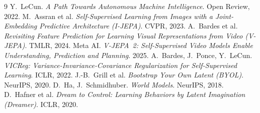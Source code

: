 \documentclass[11pt]{article}
\begin{document}
\begin{thebibliography}{9}
\small
{} Y.~LeCun. \emph{A Path Towards Autonomous Machine Intelligence}. Open Review, 2022.
 M.~Assran et al. \emph{Self-Supervised Learning from Images with a Joint-Embedding
Predictive Architecture (I-JEPA)}. CVPR, 2023.
 A.~Bardes et al. \emph{Revisiting Feature Prediction for Learning Visual
Representations from Video (V-JEPA)}. TMLR, 2024.
 Meta AI. \emph{V-JEPA~2: Self-Supervised Video Models Enable Understanding, Prediction
and Planning}. 2025.
 A.~Bardes, J.~Ponce, Y.~LeCun. \emph{VICReg: Variance-Invariance-Covariance
Regularization for Self-Supervised Learning}. ICLR, 2022.
 J.-B.~Grill et al. \emph{Bootstrap Your Own Latent (BYOL)}. NeurIPS, 2020.
 D.~Ha, J.~Schmidhuber. \emph{World Models}. NeurIPS, 2018.
 D.~Hafner et al. \emph{Dream to Control: Learning Behaviors by Latent Imagination
(Dreamer)}. ICLR, 2020.
\end{thebibliography}
\end{document}

